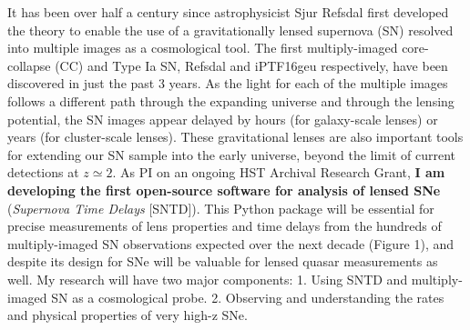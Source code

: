 It has been over half a century since astrophysicist Sjur Refsdal
first developed the theory to enable the use of a gravitationally
lensed supernova (SN) resolved into multiple images as a cosmological
tool. The first multiply-imaged core-collapse (CC) and Type Ia SN,
Refsdal \citep{Kelly:2015a} and iPTF16geu \citep{Goobar:2016}
respectively, have been discovered in just the past 3 years. As the
light for each of the multiple images follows a different path through
the expanding universe and through the lensing potential, the SN
images appear delayed by hours (for galaxy-scale lenses) or years (for
cluster-scale lenses). These gravitational lenses are also important
tools for extending our SN sample into the early universe, beyond the
limit of current detections at $z\simeq2$. As PI on an ongoing HST
Archival Research Grant, \textbf{I am developing the first open-source
software for analysis of lensed SNe} (\textit{Supernova Time Delays}
[SNTD]).  This Python package will be essential for precise
measurements of lens properties and time delays from the hundreds of
multiply-imaged SN observations expected over the next decade (Figure
1), and despite its design for SNe will be valuable for lensed quasar
measurements as well. My research will have two major components:
1. Using SNTD and multiply-imaged SN as a cosmological
probe. 2. Observing and understanding the rates and physical
properties of very high-z SNe.

